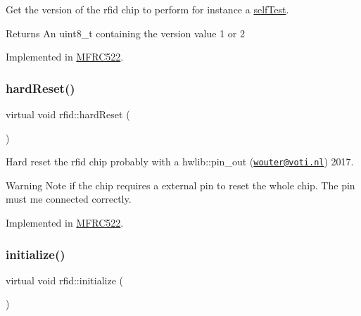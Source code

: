 Get the version of the rfid chip to perform for instance a \mbox{\hyperlink{classrfid_a93e5430380a14fd652e7ca1ce6443198}{self\+Test}}. 

\begin{DoxyReturn}{Returns}
An uint8\+\_\+t containing the version value 1 or 2 
\end{DoxyReturn}


Implemented in \mbox{\hyperlink{class_m_f_r_c522_a25fb0a50bf7db51ab9c5bc2ff4fa84e3}{M\+F\+R\+C522}}.

\mbox{\label{classrfid_a7f993197e5aa12e7b3bfb1576552bbf1}} 
\subsubsection{\texorpdfstring{hard\+Reset()}{hardReset()}}
{\footnotesize\ttfamily virtual void rfid\+::hard\+Reset (\begin{DoxyParamCaption}{ }\end{DoxyParamCaption})\hspace{0.3cm}{\ttfamily [pure virtual]}}



Hard reset the rfid chip probably with a hwlib\+::pin\+\_\+out (\href{mailto:wouter@voti.nl}{\tt wouter@voti.\+nl}) 2017. 

\begin{DoxyWarning}{Warning}
Note if the chip requires a external pin to reset the whole chip. The pin must me connected correctly. 
\end{DoxyWarning}


Implemented in \mbox{\hyperlink{class_m_f_r_c522_a016df9ed0421397c634cc79c475dbe3b}{M\+F\+R\+C522}}.

\mbox{\label{classrfid_a76f857b77fbea6776048aab6ba835a29}} 
\subsubsection{\texorpdfstring{initialize()}{initialize()}}
{\footnotesize\ttfamily virtual void rfid\+::initialize (\begin{DoxyParamCaption}{ }\end{DoxyParamCaption})\hspace{0.3cm}{\ttfamily [pure virtual]}}



